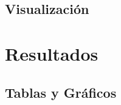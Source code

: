 \documentclass[hyperref={pdfpagelayout=SinglePage}]{beamer}
\begin{document}

\subsection{Visualización}


\section{Resultados}

\subsection{Tablas y Gráficos}
\end{document}
